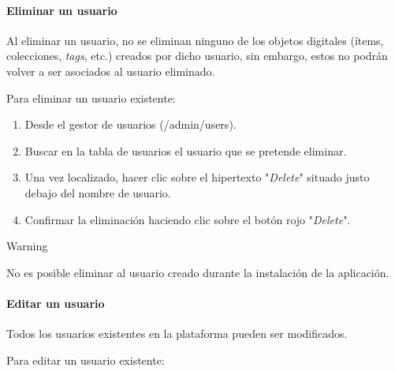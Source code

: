 \documentclass[
]{article}
\providecommand{\tightlist}{%
  \setlength{\itemsep}{0pt}\setlength{\parskip}{0pt}}
\begin{document}
\hypertarget{eliminar-un-usuario}{%
\paragraph{Eliminar un usuario}\label{eliminar-un-usuario}}

Al eliminar un usuario, no se eliminan ninguno de los objetos digitales
(ítems, colecciones, \emph{tags}, etc.) creados por dicho usuario, sin
embargo, estos no podrán volver a ser asociados al usuario eliminado.

Para eliminar un usuario existente:

\begin{enumerate}
\def\labelenumi{\arabic{enumi}.}
\tightlist
\item
  Desde el gestor de usuarios ({/admin/users}).
\item
  Buscar en la tabla de usuarios el usuario que se pretende eliminar.
\item
  Una vez localizado, hacer clic sobre el hipertexto "\emph{Delete}"
  situado justo debajo del nombre de usuario.
\item
  Confirmar la eliminación haciendo clic sobre el botón rojo
  "\emph{Delete}".
\end{enumerate}

Warning

No es posible eliminar al usuario creado durante la instalación de la
aplicación.

\hypertarget{editar-un-usuario}{%
\paragraph{Editar un usuario}\label{editar-un-usuario}}

Todos los usuarios existentes en la plataforma pueden ser modificados.

Para editar un usuario existente:
\end{document}
